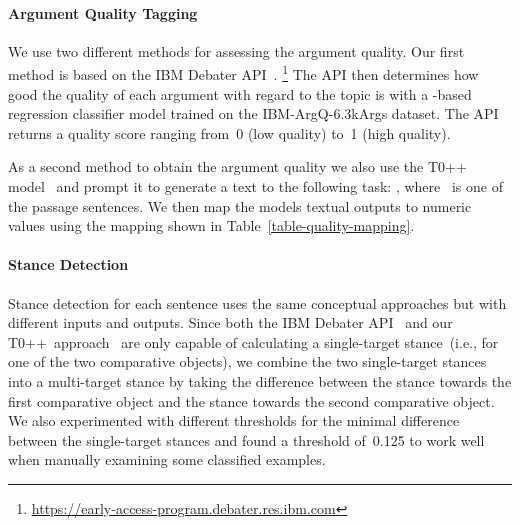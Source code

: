 \paragraph{Argument Quality Tagging}


We use two different methods for assessing the argument quality.
Our first method is based on the IBM Debater API~\cite{ToledoGCFVLJAS2019}.%
\footnote{\url{https://early-access-program.debater.res.ibm.com}}
The API then determines how good the quality of each argument with regard to the topic is with a \Bert-based~\cite{DevlinCLT2019} regression classifier model trained on the IBM-ArgQ-6.3kArgs dataset. The API returns a quality score ranging from~0 (low quality) to~1 (high quality).

As a second method to obtain the argument quality we also use the T0++ model~\cite{SanhWRBSACSLRDBXTSSKCNDCJWMSYPBWNRSSFFTBGBWR2021} and prompt it to generate a text to the following task: \hspace{.5em} , where ~is one of the passage sentences.
We then map the models textual outputs to numeric values using the mapping shown in Table~\ref{table-quality-mapping}. 

\paragraph{Stance Detection}

Stance detection for each sentence uses the same conceptual approaches but with different inputs and outputs.
Since both the IBM Debater API~\cite{BarHaimBDSS2017} and our T0++~approach~\cite{SanhWRBSACSLRDBXTSSKCNDCJWMSYPBWNRSSFFTBGBWR2021} are only capable of calculating a single-target stance~(i.e., for one of the two comparative objects), we combine the two single-target stances into a multi-target stance by taking the difference between the stance towards the first comparative object and the stance towards the second comparative object.
We also experimented with different thresholds for the minimal difference between the single-target stances and found a threshold of~0.125 to work well when manually examining some classified examples.

